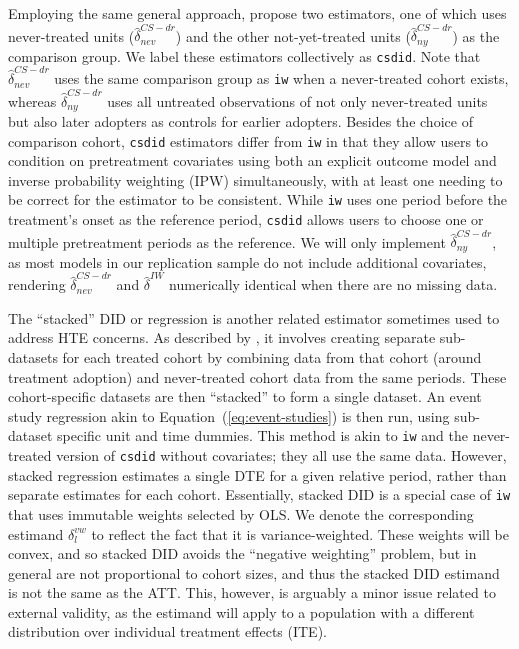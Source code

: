 \documentclass[12pt]{article}
\begin{document}
Employing the same general approach, \citet{callaway2021-did} propose two estimators, one of which uses never-treated units ($\hat\delta^{CS-dr}_{nev}$) and the other not-yet-treated units ($\hat\delta^{CS-dr}_{ny}$) as the comparison group. We label these estimators collectively as \texttt{csdid}. Note that $\hat\delta^{CS-dr}_{nev}$ uses the same comparison group as  \texttt{iw} when a never-treated cohort exists, whereas $\hat\delta^{CS-dr}_{ny}$ uses all untreated observations of not only never-treated units but also later adopters as controls for earlier adopters. Besides the choice of comparison cohort, \texttt{csdid} estimators differ from \texttt{iw} in that they allow users to condition on pretreatment covariates using both an explicit outcome model and inverse probability weighting (IPW) simultaneously, with at least one needing to be correct for the estimator to be consistent. While \texttt{iw} uses one period before the treatment's onset as the reference period, \texttt{csdid} allows users to choose one or multiple pretreatment periods as the reference.%
We will only implement $\hat\delta^{CS-dr}_{ny}$, as most models in our replication sample do not include additional covariates, rendering $\hat\delta^{CS-dr}_{nev}$ and $\hat\delta^{IW}$ numerically identical when there are no missing data.

The ``stacked'' DID or regression is another related estimator sometimes used to address HTE concerns. As described by \cite{BLW2022}, it involves creating separate sub-datasets for each treated cohort by combining data from that cohort (around treatment adoption) and never-treated cohort data from the same periods. These cohort-specific datasets are then ``stacked'' to form a single dataset. An event study regression akin to Equation~(\ref{eq:event-studies}) is then run, using sub-dataset specific unit and time dummies. This method is akin to \texttt{iw}  and the never-treated version of \texttt{csdid} without covariates; they all use the same data. However, stacked regression estimates a single DTE for a given relative period, rather than separate estimates for each cohort. Essentially, stacked DID is a special case of \texttt{iw} that uses immutable weights selected by OLS. We denote the corresponding estimand $\delta_l^{vw}$ to reflect the fact that it is variance-weighted. These weights will be convex, and so stacked DID avoids the ``negative weighting'' problem, but in general are not proportional to cohort sizes, and thus the stacked DID estimand is not the same as the ATT. This, however, is arguably a minor issue related to external validity, as the estimand will apply to a population with a different distribution over individual treatment effects (ITE).
\end{document}
